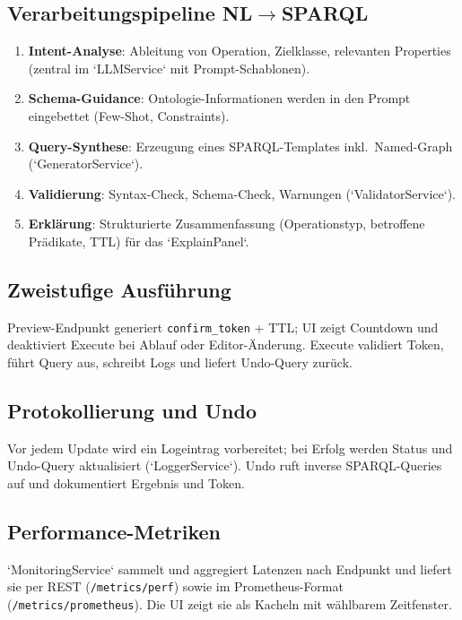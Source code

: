 \subsection{Verarbeitungspipeline NL\texorpdfstring{$\rightarrow$}{→}SPARQL}
\begin{enumerate}
  \item \textbf{Intent-Analyse}: Ableitung von Operation, Zielklasse, relevanten Properties (zentral im `LLMService` mit Prompt-Schablonen).
  \item \textbf{Schema-Guidance}: Ontologie-Informationen werden in den Prompt eingebettet (Few-Shot, Constraints).
  \item \textbf{Query-Synthese}: Erzeugung eines SPARQL-Templates inkl.\ Named-Graph (`GeneratorService`).
  \item \textbf{Validierung}: Syntax-Check, Schema-Check, Warnungen (`ValidatorService`).
  \item \textbf{Erklärung}: Strukturierte Zusammenfassung (Operationstyp, betroffene Prädikate, TTL) für das `ExplainPanel`.
\end{enumerate}

\subsection{Zweistufige Ausführung}
Preview-Endpunkt generiert \texttt{confirm\_token} + TTL; UI zeigt Countdown und deaktiviert Execute bei Ablauf oder Editor-Änderung. Execute validiert Token, führt Query aus, schreibt Logs und liefert Undo-Query zurück.

\subsection{Protokollierung und Undo}
Vor jedem Update wird ein Logeintrag vorbereitet; bei Erfolg werden Status und Undo-Query aktualisiert (`LoggerService`). Undo ruft inverse SPARQL-Queries auf und dokumentiert Ergebnis und Token.

\subsection{Performance-Metriken}
`MonitoringService` sammelt und aggregiert Latenzen nach Endpunkt und liefert sie per REST (\texttt{/metrics/perf}) sowie im Prometheus-Format (\texttt{/metrics/prometheus}). Die UI zeigt sie als Kacheln mit wählbarem Zeitfenster.

